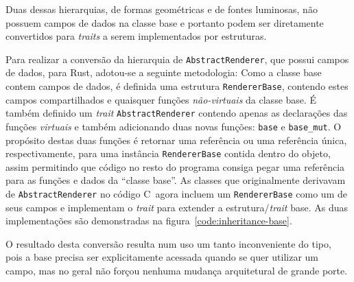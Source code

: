 \documentclass[tg]{mdtufsm}
\def\Cpp{{C\nolinebreak[4]\raisebox{.20ex}{\small\bf++}}}
\begin{document}
Duas dessas hierarquias, de formas geométricas e de fontes luminosas, não possuem campos de dados na classe base e portanto podem ser diretamente convertidos para \emph{traits} a serem implementados por estruturas.

Para realizar a conversão da hierarquia de \texttt{AbstractRenderer}, que possui campos de dados, para Rust, adotou-se a seguinte metodologia: Como a classe base contem campos de dados, é definida uma estrutura \texttt{RendererBase}, contendo estes campos compartilhados e quaisquer funções \emph{não-virtuais} da classe base. É também definido um \emph{trait} \texttt{AbstractRenderer} contendo apenas as declarações das funções \emph{virtuais} e também adicionando duas novas funções: \texttt{base} e \texttt{base\_mut}. O propósito destas duas funções é retornar uma referência ou uma referência única, respectivamente, para uma instância \texttt{RendererBase} contida dentro do objeto, assim permitindo que código no resto do programa consiga pegar uma referência para as funções e dados da ``classe base''. As classes que originalmente derivavam de \texttt{AbstractRenderer} no código \Cpp\ agora incluem um \texttt{RendererBase} como um de seus campos e implementam o \emph{trait} para extender a estrutura/\emph{trait} base. As duas implementações são demonstradas na figura~\ref{code:inheritance-base}.

O resultado desta conversão resulta num uso um tanto inconveniente do tipo, pois a base precisa ser explicitamente acessada quando se quer utilizar um campo, mas no geral não forçou nenhuma mudança arquitetural de grande porte.
\end{document}
